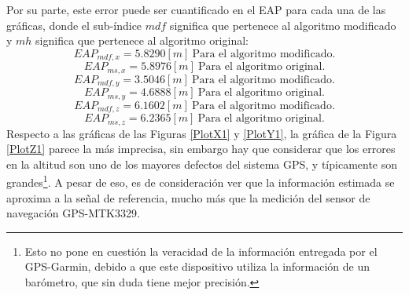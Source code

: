 \documentclass[10pt]{report}
\numberwithin{equation}{chapter}
\numberwithin{algorithm}{chapter}
\begin{document}
Por su parte, este error puede ser cuantificado en el EAP para cada una de las gráficas, donde el sub-índice $mdf$ significa que pertenece al algoritmo modificado y $mh$ significa que pertenece al algoritmo original:
\begin{equation*}
EAP_{mdf,x}=5.8290 [m]~\text{Para el algoritmo modificado.}
\end{equation*}
\begin{equation*}
EAP_{ms,x}=5.8976 [m]~\text{Para el algoritmo original.}
\end{equation*}
\begin{equation*}
EAP_{mdf,y}=3.5046 [m]~\text{Para el algoritmo modificado.}
\end{equation*}
\begin{equation*}
EAP_{ms,y}=4.6888 [m]~\text{Para el algoritmo original.}
\end{equation*}
\begin{equation*}
EAP_{mdf,z}=6.1602 [m]~\text{Para el algoritmo modificado.}
\end{equation*}
\begin{equation*}
EAP_{ms,z}=6.2365 [m]~\text{Para el algoritmo original.}
\end{equation*}
Respecto a las gráficas de las Figuras \ref{PlotX1} y \ref{PlotY1}, la gráfica de la Figura \ref{PlotZ1} parece la más imprecisa, sin embargo hay que considerar que los errores en la altitud son uno de los mayores defectos del sistema GPS, y típicamente son grandes\footnote{Esto no pone en cuestión la veracidad de la información entregada por el GPS-Garmin, debido a que este dispositivo utiliza la información de un barómetro, que sin duda tiene mejor precisión.}. A pesar de eso, es de consideración ver que la información estimada se aproxima a la señal de referencia, mucho más que la medición del sensor de navegación GPS-MTK3329. 
\end{document}
